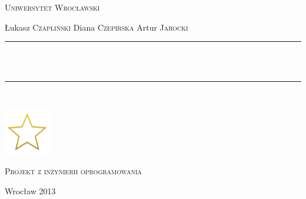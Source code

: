 \documentclass[11pt,wide]{mwart}
\newcommand{\HRule}{\rule{\linewidth}{0.5mm}}
\begin{document}
\begin{titlepage}
  \begin{center}

    \textsc{\LARGE Uniwersytet Wrocławski}\\[1.5cm]


    \vspace{3cm}

    \begin{minipage}{\textwidth}
      \begin{center} \Large
        Łukasz \textsc{Czapliński}
        Diana \textsc{Czepirska}
        Artur \textsc{Jarocki}
      \end{center}
    \end{minipage}

    \vspace{0.5cm}



    \HRule \\[0.4cm]
    { \huge \bfseries <Nazwa aplikacji>  \\[0.4cm] }

    \HRule \\[1.5cm]


    \vspace{1cm}

    \includegraphics[width=0.15\textwidth]{./non-starred.png}~\\[1cm]
    
    \vfill
    
    \textsc{\Large Projekt z inżynierii oprogramowania}\\[0.5cm]

    \vspace{1cm}

    {\large Wrocław 2013}

  \end{center}
\end{titlepage}
\end{document}
